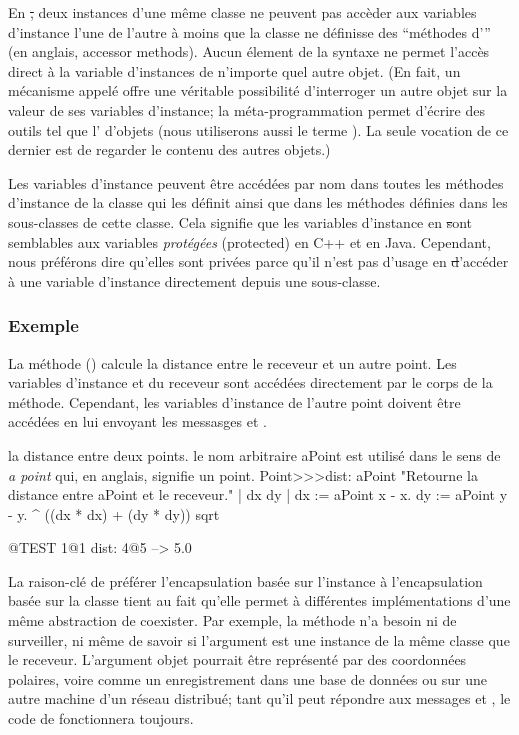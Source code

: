 \documentclass[a4paper,10pt,twoside]{book}
\begin{document}
En \st, deux instances d'une m\^eme classe ne peuvent pas acc\`eder aux variables d'instance l'une de l'autre \`a moins que la classe ne d\'efinisse des ``m\'ethodes d''' (en anglais, accessor methods).
Aucun \'element de la syntaxe ne permet l'acc\`es direct \`a la variable d'instances de n'importe quel autre objet.
(En fait, un m\'ecanisme appel\'e 
offre une v\'eritable possibilit\'e d'interroger un autre objet sur la valeur de ses variables d'instance; la m\'eta-programmation permet d'\'ecrire des outils tel que l' d'objets (nous utiliserons aussi le terme ). La seule vocation de ce dernier est de regarder le contenu des autres objets.)

Les variables d'instance peuvent \^etre acc\'ed\'ees par 
nom dans toutes les m\'ethodes d'instance de la classe qui les d\'efinit
ainsi que dans les m\'ethodes d\'efinies dans les sous-classes de cette classe.
Cela signifie que les variables d'instance en \st sont semblables aux
variables \emph{prot\'eg\'ees} (protected) en C++ et en Java. Cependant,
nous pr\'ef\'erons dire qu'elles sont priv\'ees parce qu'il n'est pas d'usage en \st d'acc\'eder \`a une variable d'instance directement depuis une sous-classe. 
\subsubsection{Exemple}
La m\'ethode  () calcule la distance entre le receveur et un autre point. Les variables d'instance  et  du receveur sont acc\'ed\'ees directement par le corps de la m\'ethode. Cependant, les variables d'instance de l'autre point doivent \^etre acc\'ed\'ees en lui envoyant les messasges  et .

\begin{method}[dist:]{la distance entre deux points. le nom arbitraire aPoint est utilis\'e dans le sens de \emph{a point} qui, en anglais, signifie un point.}
Point>>>dist: aPoint 
	"Retourne la distance entre aPoint et le receveur."
	| dx dy |
	dx := aPoint x - x.
	dy :=  aPoint y - y.
	^ ((dx * dx) + (dy * dy)) sqrt
\end{method}

\begin{code}{@TEST}
1@1 dist: 4@5 --> 5.0
\end{code}

La raison-cl\'e de pr\'ef\'erer l'encapsulation bas\'ee sur l'instance
\`a l'encapsulation bas\'ee sur la classe tient au fait qu'elle permet
\`a diff\'erentes impl\'ementations d'une m\^eme abstraction de coexister.
Par exemple, la m\'ethode  n'a besoin ni de surveiller, ni 
m\^eme de savoir si l'argument  est une instance de la m\^eme classe
que le receveur.  L'argument objet pourrait \^etre repr\'esent\'e par des
coordonn\'ees polaires, voire comme un enregistrement dans une base de donn\'ees ou sur une autre machine d'un r\'eseau distribu\'e; tant qu'il peut r\'epondre
aux messages  et , le code de  fonctionnera toujours.
\end{document}
